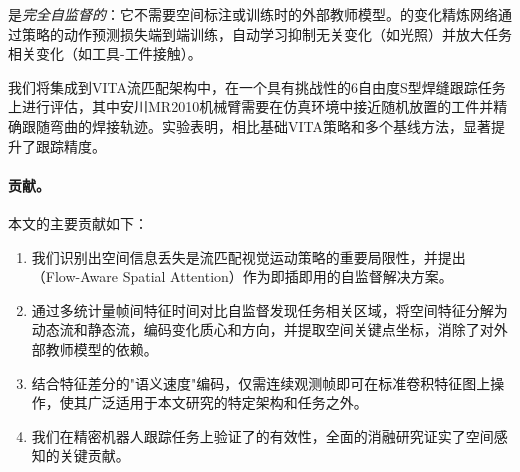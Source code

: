 \fasa{}是\emph{完全自监督的}：它不需要空间标注或训练时的外部教师模型。\fasa{}的变化精炼网络通过策略的动作预测损失端到端训练，自动学习抑制无关变化（如光照）并放大任务相关变化（如工具-工件接触）。

我们将\fasa{}集成到VITA流匹配架构中，在一个具有挑战性的6自由度S型焊缝跟踪任务上进行评估，其中安川MR2010机械臂需要在仿真环境中接近随机放置的工件并精确跟随弯曲的焊接轨迹。实验表明，相比基础VITA策略和多个基线方法，\fasa{}显著提升了跟踪精度。

\paragraph{贡献。}本文的主要贡献如下：
\begin{enumerate}[leftmargin=*,itemsep=2pt]
    \item 我们识别出空间信息丢失是流匹配视觉运动策略的重要局限性，并提出\fasa{}（Flow-Aware Spatial Attention）作为即插即用的自监督解决方案。
    \item \fasa{}通过多统计量帧间特征时间对比自监督发现任务相关区域，将空间特征分解为动态流和静态流，编码变化质心和方向，并提取空间关键点坐标，消除了对外部教师模型的依赖。
    \item 结合特征差分的"语义速度"编码，\fasa{}仅需连续观测帧即可在标准卷积特征图上操作，使其广泛适用于本文研究的特定架构和任务之外。
    \item 我们在精密机器人跟踪任务上验证了\fasa{}的有效性，全面的消融研究证实了空间感知的关键贡献。
\end{enumerate}

